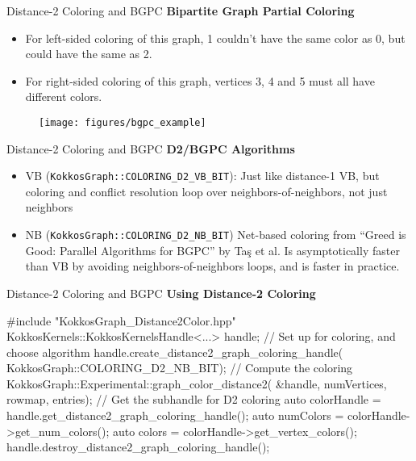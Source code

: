 \begin{frame}[fragile]{Distance-2 Coloring and BGPC}
\textbf{Bipartite Graph Partial Coloring}
\begin{itemize}
  \item For left-sided coloring of this graph, 1 couldn't have the same color as 0, but could have the same as 2.
  \item For right-sided coloring of this graph, vertices 3, 4 and 5 must all have different colors.
\end{itemize}
\begin{figure}[h]
\texttt{[image: figures/bgpc\_example]}
\end{figure}
\end{frame}

\begin{frame}[fragile]{Distance-2 Coloring and BGPC}
\textbf{D2/BGPC Algorithms}
\begin{itemize}
  \item VB (\verb!KokkosGraph::COLORING_D2_VB_BIT!): Just like distance-1 VB, but coloring and conflict resolution loop over neighbors-of-neighbors, not just neighbors
  \item NB (\verb!KokkosGraph::COLORING_D2_NB_BIT!) Net-based coloring from ``Greed is Good: Parallel Algorithms for BGPC'' by Ta\c{s} et al.
    Is asymptotically faster than VB by avoiding neighbors-of-neighbors loops, and is faster in practice.
\end{itemize}
\end{frame}

\begin{frame}[fragile]{Distance-2 Coloring and BGPC}
\textbf{Using Distance-2 Coloring}

\begin{code}
  #include "KokkosGraph_Distance2Color.hpp"
  KokkosKernels::KokkosKernelsHandle<...> handle;
  // Set up for coloring, and choose algorithm
  handle.create_distance2_graph_coloring_handle(
    KokkosGraph::COLORING_D2_NB_BIT);
  // Compute the coloring
  KokkosGraph::Experimental::graph_color_distance2(
    &handle, numVertices, rowmap, entries);
  // Get the subhandle for D2 coloring
  auto colorHandle =
    handle.get_distance2_graph_coloring_handle();
  auto numColors = colorHandle->get_num_colors();
  auto colors = colorHandle->get_vertex_colors();
  handle.destroy_distance2_graph_coloring_handle();
\end{code}
\end{frame}


